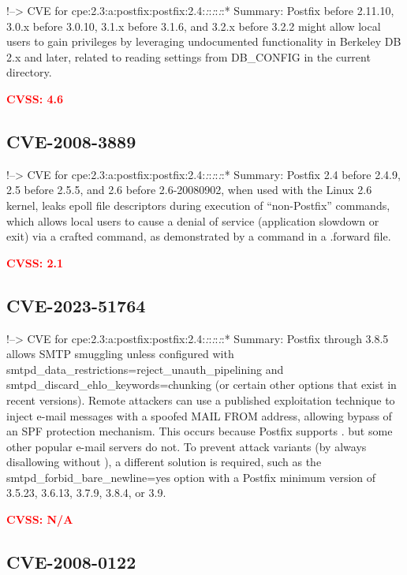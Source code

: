 \documentclass[a4paper, 12pt]{article}
\begin{document}
!--\textgreater{} CVE for
cpe:2.3:a:postfix:postfix:2.4:\emph{:}:\emph{:}:\emph{:}:* Summary:
Postfix before 2.11.10, 3.0.x before 3.0.10, 3.1.x before 3.1.6, and
3.2.x before 3.2.2 might allow local users to gain privileges by
leveraging undocumented functionality in Berkeley DB 2.x and later,
related to reading settings from DB\_CONFIG in the current directory.

\textbf{\textcolor{red}{CVSS: 4.6}}

\hypertarget{cve-2008-3889}{%
\subsection{CVE-2008-3889}\label{cve-2008-3889}}

!--\textgreater{} CVE for
cpe:2.3:a:postfix:postfix:2.4:\emph{:}:\emph{:}:\emph{:}:* Summary:
Postfix 2.4 before 2.4.9, 2.5 before 2.5.5, and 2.6 before 2.6-20080902,
when used with the Linux 2.6 kernel, leaks epoll file descriptors during
execution of ``non-Postfix'' commands, which allows local users to cause
a denial of service (application slowdown or exit) via a crafted
command, as demonstrated by a command in a .forward file.

\textbf{\textcolor{red}{CVSS: 2.1}}

\hypertarget{cve-2023-51764}{%
\subsection{CVE-2023-51764}\label{cve-2023-51764}}

!--\textgreater{} CVE for
cpe:2.3:a:postfix:postfix:2.4:\emph{:}:\emph{:}:\emph{:}:* Summary:
Postfix through 3.8.5 allows SMTP smuggling unless configured with
smtpd\_data\_restrictions=reject\_unauth\_pipelining and
smtpd\_discard\_ehlo\_keywords=chunking (or certain other options that
exist in recent versions). Remote attackers can use a published
exploitation technique to inject e-mail messages with a spoofed MAIL
FROM address, allowing bypass of an SPF protection mechanism. This
occurs because Postfix supports . but some other popular e-mail servers
do not. To prevent attack variants (by always disallowing without ), a
different solution is required, such as the
smtpd\_forbid\_bare\_newline=yes option with a Postfix minimum version
of 3.5.23, 3.6.13, 3.7.9, 3.8.4, or 3.9.

\textbf{\textcolor{red}{CVSS: N/A}}

\hypertarget{cve-2008-0122}{%
\subsection{CVE-2008-0122}\label{cve-2008-0122}}
\end{document}
